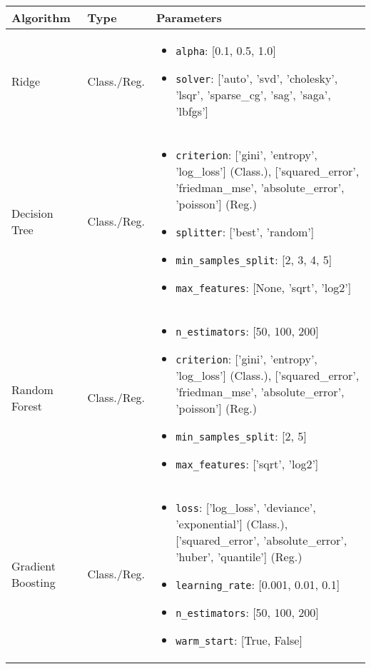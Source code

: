 \begin{longtable}{|>{\raggedright}p{2cm}|>{\raggedright}p{3cm}|>{\raggedright\arraybackslash}p{8cm}|}
\hline
\textbf{Algorithm} & \textbf{Type} & \textbf{Parameters} \\
\hline
Ridge & Class./Reg. & 
\begin{itemize}
    \item \texttt{alpha}: [0.1, 0.5, 1.0]
    \item \texttt{solver}: ['auto', 'svd', 'cholesky', 'lsqr', 'sparse\_cg', 'sag', 'saga', 'lbfgs']
\end{itemize} \\
\hline
Decision Tree & Class./Reg. & 
\begin{itemize}
    \item \texttt{criterion}: ['gini', 'entropy', 'log\_loss'] (Class.), ['squared\_error', 'friedman\_mse', 'absolute\_error', 'poisson'] (Reg.)
    \item \texttt{splitter}: ['best', 'random']
    \item \texttt{min\_samples\_split}: [2, 3, 4, 5]
    \item \texttt{max\_features}: [None, 'sqrt', 'log2']
\end{itemize} \\
\hline
Random Forest & Class./Reg. & 
\begin{itemize}
    \item \texttt{n\_estimators}: [50, 100, 200]
    \item \texttt{criterion}: ['gini', 'entropy', 'log\_loss'] (Class.), ['squared\_error', 'friedman\_mse', 'absolute\_error', 'poisson'] (Reg.)
    \item \texttt{min\_samples\_split}: [2, 5]
    \item \texttt{max\_features}: ['sqrt', 'log2']
\end{itemize} \\
\hline
Gradient Boosting & Class./Reg. & 
\begin{itemize}
    \item \texttt{loss}: ['log\_loss', 'deviance', 'exponential'] (Class.), ['squared\_error', 'absolute\_error', 'huber', 'quantile'] (Reg.)
    \item \texttt{learning\_rate}: [0.001, 0.01, 0.1]
    \item \texttt{n\_estimators}: [50, 100, 200]
    \item \texttt{warm\_start}: [True, False]
\end{itemize} \\

\end{longtable}
